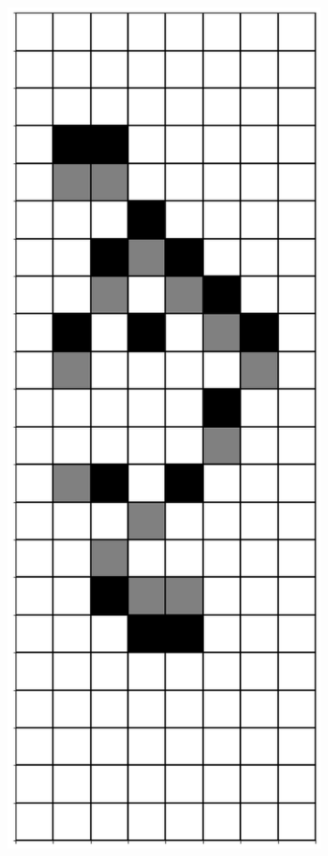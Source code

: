 \documentclass[12pt]{article}
\numberwithin{figure}{section} %
\begin{document}
\begin{figure}[H]
\begin{subfigure}{0.19\textwidth}
     \subcaption{}
   \end{subfigure}
     \begin{subfigure}{0.19\textwidth}
     \centering
     \includegraphics[width=\linewidth]{Section4/28.6}

\end{subfigure}
\end{figure}
\end{document}
